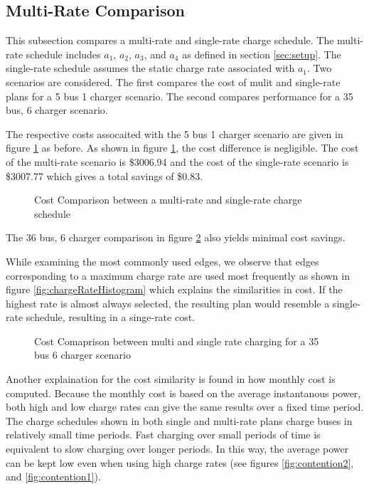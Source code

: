 \subsection{Multi-Rate Comparison}
This subsection compares a multi-rate and single-rate charge schedule. The multi-rate schedule includes $a_1$, $a_2$, $a_3$, and $a_4$ as defined in section \ref{sec:setup}.  The single-rate schedule assumes the static charge rate associated with $a_1$. Two scenarios are considered.  The first compares the cost of mulit and single-rate plans for a 5 bus 1 charger scenario. The second compares performance for a 35 bus, 6 charger scenario. 
\par The respective costs assocaited with the 5 bus 1 charger scenario are given in figure \ref{fig:multiRateCostComparison} as before.  As shown in figure \ref{fig:multiRateCostComparison}, the cost difference is negligible.  The cost of the multi-rate scenario is \$3006.94 and the cost of the single-rate scenario is \$3007.77 which gives a total savings of \$0.83. 
\begin{figure}
	\centering
	\caption{Cost Comparison between a multi-rate and single-rate charge schedule}
	\label{fig:multiRateCostComparison}
\end{figure}
The 36 bus, 6 charger comparison in figure \ref{fig:costComparisonMultiVsSingleLarge} also yields minimal cost savings. 
\par While examining the most commonly used edges, we observe that edges corresponding to a maximum charge rate are used most frequently as shown in figure \ref{fig:chargeRateHistogram} which explains the similarities in cost. If the highest rate is almost always selected, the resulting plan would resemble a single-rate schedule, resulting in a singe-rate cost.  
\begin{figure}
	\caption{Cost Comaprison between multi and single rate charging for a 35 bus 6 charger scenario}
	\label{fig:costComparisonMultiVsSingleLarge}
\end{figure}
\par Another explaination for the cost similarity is found in how monthly cost is computed. Because the monthly cost is based on the average instantanous power, both high and low charge rates can give the same results over a fixed time period. The charge schedules shown in both single and multi-rate plans charge buses in relatively small time periods. Fast charging over small periods of time is equivalent to slow charging over longer periods. In this way, the average power can be kept low even when using high charge rates (see figures \ref{fig:contention2}, and \ref{fig:contention1}). 
